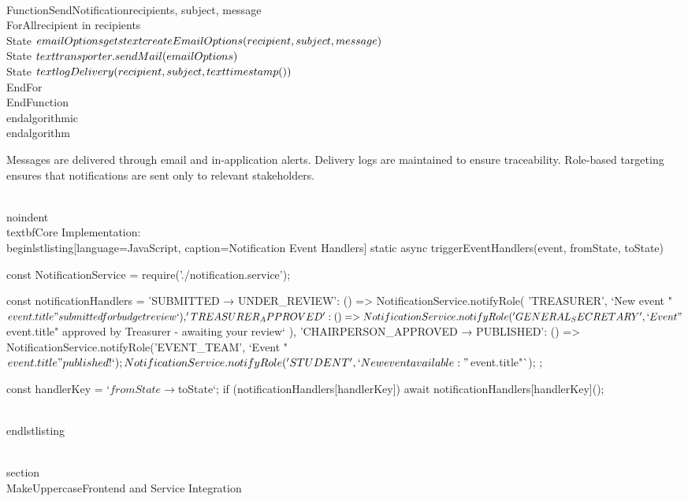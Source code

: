 \\Function{SendNotification}{recipients, subject, message}
    \\ForAll{recipient in recipients}
        \\State $emailOptions \\gets \\text{createEmailOptions}(recipient, subject, message)$
        \\State $\\text{transporter.sendMail}(emailOptions)$
        \\State $\\text{logDelivery}(recipient, subject, \\text{timestamp}())$
    \\EndFor
\\EndFunction
\\end{algorithmic}
\\end{algorithm}

Messages are delivered through email and in-application alerts. Delivery logs are maintained to ensure traceability. Role-based targeting ensures that notifications are sent only to relevant stakeholders.

\\noindent\\textbf{Core Implementation:}
\\begin{lstlisting}[language=JavaScript, caption=Notification Event Handlers]
static async triggerEventHandlers(event, fromState, toState) {
  const NotificationService = require('./notification.service');
  
  const notificationHandlers = {
    'SUBMITTED → UNDER_REVIEW': () => NotificationService.notifyRole(
      'TREASURER', 
      `New event "${event.title}" submitted for budget review`
    ),
    'TREASURER_APPROVED': () => NotificationService.notifyRole(
      'GENERAL_SECRETARY', 
      `Event "${event.title}" approved by Treasurer - awaiting your review`
    ),
    'CHAIRPERSON_APPROVED → PUBLISHED': () => {
      NotificationService.notifyRole('EVENT_TEAM', `Event "${event.title}" published!`);
      NotificationService.notifyRole('STUDENT', `New event available: "${event.title}"`);
    }
  };

  const handlerKey = `${fromState} → ${toState}`;
  if (notificationHandlers[handlerKey]) {
    await notificationHandlers[handlerKey]();
  }
}
\\end{lstlisting}

\\section{\\MakeUppercase{Frontend and Service Integration}}

